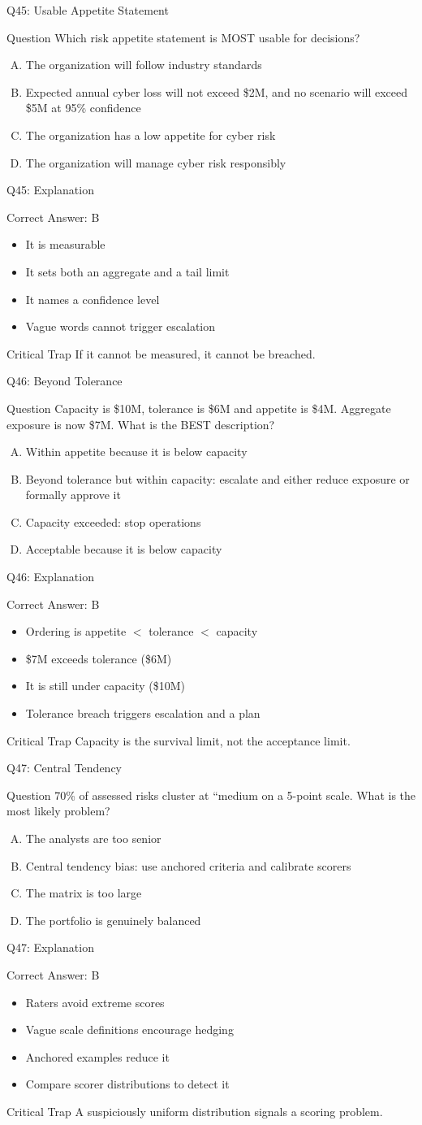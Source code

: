 \documentclass[aspectratio=169]{beamer}
\newcommand{\hq}[7]{%
  \begin{frame}{Q#1: #2}
    \begin{block}{Question}
      #3
    \end{block}
    \begin{enumerate}[(A)]
      #4
    \end{enumerate}
  \end{frame}
  \begin{frame}{Q#1: Explanation}
    \begin{block}{Correct Answer: #5}
      \begin{itemize}
        #6
      \end{itemize}
    \end{block}
    \begin{alertblock}{Critical Trap}
      #7
    \end{alertblock}
  \end{frame}
}
\begin{document}
\hq{45}{Usable Appetite Statement}
{Which risk appetite statement is MOST usable for decisions?}
{\item The organization will follow industry standards
 \item Expected annual cyber loss will not exceed \$2M, and no scenario will exceed \$5M at 95\% confidence
 \item The organization has a low appetite for cyber risk
 \item The organization will manage cyber risk responsibly}
{B}
{\item It is measurable
 \item It sets both an aggregate and a tail limit
 \item It names a confidence level
 \item Vague words cannot trigger escalation}
{If it cannot be measured, it cannot be breached.}

\hq{46}{Beyond Tolerance}
{Capacity is \$10M, tolerance is \$6M and appetite is \$4M. Aggregate exposure is now \$7M. What is the BEST description?}
{\item Within appetite because it is below capacity
 \item Beyond tolerance but within capacity: escalate and either reduce exposure or formally approve it
 \item Capacity exceeded: stop operations
 \item Acceptable because it is below capacity}
{B}
{\item Ordering is appetite $<$ tolerance $<$ capacity
 \item \$7M exceeds tolerance (\$6M)
 \item It is still under capacity (\$10M)
 \item Tolerance breach triggers escalation and a plan}
{Capacity is the survival limit, not the acceptance limit.}

\hq{47}{Central Tendency}
{70\% of assessed risks cluster at ``medium on a 5-point scale. What is the most likely problem?}
{\item The analysts are too senior
 \item Central tendency bias: use anchored criteria and calibrate scorers
 \item The matrix is too large
 \item The portfolio is genuinely balanced}
{B}
{\item Raters avoid extreme scores
 \item Vague scale definitions encourage hedging
 \item Anchored examples reduce it
 \item Compare scorer distributions to detect it}
{A suspiciously uniform distribution signals a scoring problem.}
\end{document}
